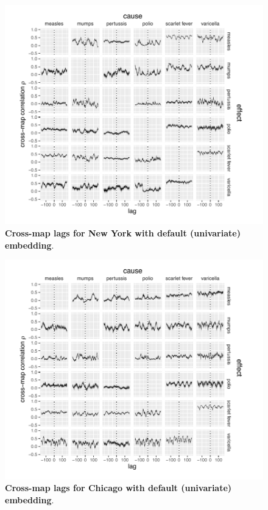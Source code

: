 \begin{figure}%
\begin{center}
  \includegraphics[width=6in]{dataflow/out/fig_cities_corrbylag/nyc_self_uniform.pdf}
  \end{center}
  \caption{\textbf{Cross-map lags for New York with default (univariate) embedding}.  \label{fig:cities_corrbylag_nyc_self_uniform}}
\end{figure}

\begin{figure}%
\begin{center}
  \includegraphics[width=6in]{dataflow/out/fig_cities_corrbylag/chi_self_uniform.pdf}
  \end{center}
  \caption{\textbf{Cross-map lags for Chicago with default (univariate) embedding}.  \label{fig:cities_corrbylag_chi_self_uniform}}
\end{figure}

